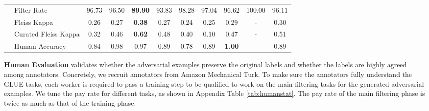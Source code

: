 \documentclass{article}
\begin{document}
\begin{table}[t]
{{\begin{tabular}{ll|cccccccc|c}
           & Filter Rate  & 96.73 & 96.50 & \textbf{89.90} & 93.83 & 98.28 & 97.04 & 96.62 & 100.00 & 96.11 \\
           & Fleiss Kappa   & 0.26 & 0.27 & \textbf{0.38} & 0.27 & 0.24 & 0.25 & 0.29 & - & 0.30 \\
           & Curated Fleiss Kappa   & 0.32 & 0.46 & \textbf{0.62} & 0.48 & 0.40 & 0.10 & 0.47 & - & 0.51 \\
           & Human Accuracy  & 0.84 & 0.98 & 0.97 & 0.89 & 0.78 & 0.89 & \textbf{1.00} & - & 0.89 \\
           \bottomrule
    \end{tabular}
    \vspace{-3mm}
  }
}
\end{table}


\textbf{Human Evaluation} validates whether the adversarial examples preserve the original labels and whether the labels are highly agreed among annotators. Concretely, we recruit annotators from Amazon Mechanical Turk. To make sure the annotators fully understand the GLUE tasks, each worker is required to pass  a training step to be qualified to work on the main filtering tasks for the generated adversarial examples. We tune the pay rate for different tasks, as shown in Appendix Table \ref{tab:humanstat}. The pay rate of the main filtering phase is twice as much as that of the training phase.
\end{document}
